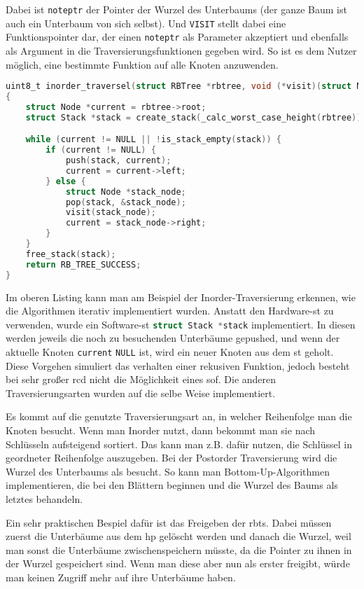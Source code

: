 \documentclass[11pt]{article}
\newcommand{\lstin}[1]{\lstinline[language=C]{#1}}
\begin{document}
Dabei ist \lstin{noteptr} der Pointer der Wurzel des Unterbaums (der ganze Baum ist auch ein Unterbaum von sich selbst). Und \lstin{VISIT} stellt dabei eine Funktionspointer dar, der einen \lstin{noteptr} als Parameter akzeptiert und ebenfalls als Argument in die Traversierungsfunktionen gegeben wird.
So ist es dem Nutzer möglich, eine bestimmte Funktion auf alle Knoten anzuwenden. 

\begin{lstlisting}[language=C]
uint8_t inorder_traversel(struct RBTree *rbtree, void (*visit)(struct Node*))
{
    struct Node *current = rbtree->root;
    struct Stack *stack = create_stack(_calc_worst_case_height(rbtree));

    while (current != NULL || !is_stack_empty(stack)) {
        if (current != NULL) {
            push(stack, current);
            current = current->left;
        } else {
            struct Node *stack_node;
            pop(stack, &stack_node);
            visit(stack_node);
            current = stack_node->right;
        }
    }
    free_stack(stack);
    return RB_TREE_SUCCESS;
}
\end{lstlisting}

Im oberen Listing kann man am Beispiel der Inorder-Traversierung erkennen, wie die Algorithmen iterativ implementiert wurden. Anstatt den Hardware-\gls{st} zu verwenden, wurde ein Software-\gls{st} \lstin{struct Stack *stack} implementiert. 
In diesen werden jeweils die noch zu besuchenden Unterbäume gepushed, und wenn der aktuelle Knoten \lstin{current} \lstin{NULL} ist, wird ein neuer Knoten aus dem \gls{st} geholt.
Diese Vorgehen simuliert das verhalten einer rekusiven Funktion, jedoch besteht bei sehr großer \gls{rcd} nicht die Möglichkeit eines \gls{sof}. Die anderen Traversierungsarten wurden auf die selbe Weise implementiert.

Es kommt auf die genutzte Traversierungsart an, in welcher Reihenfolge man die Knoten besucht. Wenn man Inorder nutzt, dann bekommt man sie nach Schlüsseln aufsteigend sortiert. Das kann man z.B. dafür nutzen, die Schlüssel in geordneter Reihenfolge auszugeben.
Bei der Postorder Traversierung wird die Wurzel des Unterbaums als besucht. So kann man Bottom-Up-Algorithmen implementieren, die bei den Blättern beginnen und die Wurzel des Baums als letztes behandeln.

Ein sehr praktischen Bespiel dafür ist das Freigeben der \glspl{rbt}. Dabei müssen zuerst die Unterbäume aus dem \gls{hp} gelöscht werden und danach die Wurzel, weil man sonst die Unterbäume zwischenspeichern müsste, da die Pointer zu ihnen in der Wurzel gespeichert sind.
Wenn man diese aber nun als erster freigibt, würde man keinen Zugriff mehr auf ihre Unterbäume haben.
\end{document}
